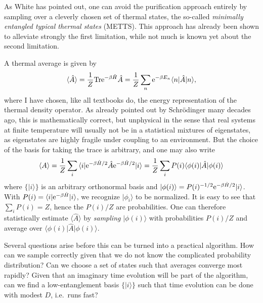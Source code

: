 \documentclass[a4paper,10pt,oneside,onecolumn,1p,times]{elsarticle}
\newcommand{\tr}{{\rm Tr }}
\newcommand{\eul}{{\rm e }}
\newcommand{\bra}[1]{\mbox{$\langle #1  |$}}
\newcommand{\ket}[1]{\mbox{$| #1  \rangle$}}
\begin{document}
As White \cite{Stoudenmire10,White09} has pointed out, one can avoid the purification approach entirely by sampling over a cleverly chosen set of thermal states, the so-called {\em minimally entangled typical thermal states} (METTS). This approach has already been shown to alleviate strongly the first limitation, while not much is known yet about the second limitation. 

A thermal average is given by
\begin{equation}
\langle \hat{A} \rangle = \frac{1}{Z} \tr \eul^{-\beta \hat{H}} \hat{A} = \frac{1}{Z} \sum_n \eul^{-\beta E_n} \bra{n} \hat{A} \ket{n} ,
\end{equation}
where I have chosen, like all textbooks do, the energy representation of the thermal density operator. As already pointed out by Schr\"{o}dinger many decades ago, this is mathematically correct, but unphysical in the sense that real systems at finite temperature will usually not be in a statistical mixtures of eigenstates, as eigenstates are highly fragile under coupling to an environment. But the choice of the basis for taking the trace is arbitrary, and one may also write
\begin{equation}
\langle A \rangle = \frac{1}{Z} \sum_i \bra{i} \eul^{-\beta\hat{H}/2} \hat{A} \eul^{-\beta\hat{H}/2} \ket{i}
= \frac{1}{Z} \sum_i P(i) \bra{\phi(i)} \hat{A} \ket{\phi(i)}
\end{equation}
where $\{ \ket{i} \}$ is an arbitrary orthonormal basis and $\ket{\phi(i)} = P(i)^{-1/2} \eul^{-\beta\hat{H}/2} \ket{i}$. With $P(i) = \bra{i} \eul^{-\beta \hat{H}} \ket{i}$, we recognize $\ket{\phi_{i}}$ to be normalized. It is easy to see that $\sum_i P(i) = Z$, hence the $P(i)/Z$ are probabilities. One can therefore statistically estimate $\langle \hat{A}\rangle$ by {\em sampling} $\ket{\phi(i)}$ with probabilities $P(i)/Z$ and average over $\bra{\phi(i)} \hat{A} \ket{\phi(i)}$.

Several questions arise before this can be turned into a practical algorithm. How can we sample correctly given that we do not know the complicated probability distribution? Can we choose a set of states such that averages converge most rapidly? Given that an imaginary time evolution will be part of the algorithm, can we find a low-entanglement basis $\{ \ket{i} \}$ such that time evolution can be done with modest $D$, i.e.\ runs fast?
\end{document}
